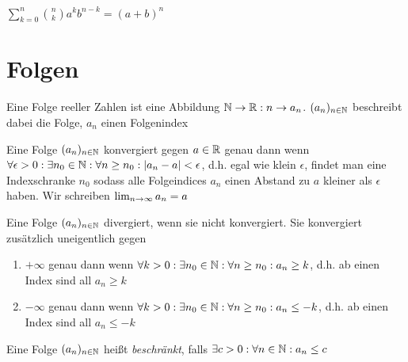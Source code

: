 \documentclass[]{article}
\begin{document}
\begin{satz}
	$\sum_{k=0}^{n} \binom{n}{k}a^k b^{n-k} = (a+b)^n$ 
\end{satz}

\section{Folgen}

\begin{definition}
	Eine Folge reeller Zahlen ist eine Abbildung $\mathbb{N} \rightarrow \mathbb{R} : n \rightarrow a_n$. $(a_{n})_{n \in \mathbb{N}}$ beschreibt dabei die Folge, $a_n$ einen Folgenindex
\end{definition}


\begin{definition}
	Eine Folge $(a_{n})_{n \in \mathbb{N}}$ konvergiert gegen $a \in \mathbb{R}$ genau dann wenn \\ $\forall \epsilon > 0 : \exists n_0 \in \mathbb{N} : \forall n \geq n_0 : | a_n - a | < \epsilon$, d.h. egal wie klein $\epsilon$, findet man eine Indexschranke $n_0$ sodass alle Folgeindices $a_n$ einen Abstand zu $a$ kleiner als $\epsilon$ haben. Wir schreiben $\lim_{n \rightarrow \infty} a_n = a$
\end{definition}

\begin{definition}
	Eine Folge $(a_{n})_{n \in \mathbb{N}}$ divergiert, wenn sie nicht konvergiert. Sie konvergiert zusätzlich uneigentlich gegen
	\begin{enumerate}[noitemsep]
		\item $+ \infty$ genau dann wenn $\forall k > 0 : \exists n_0 \in \mathbb{N} : \forall n \geq n_0 : a_n \geq k$, d.h. ab einen Index sind all $a_n \geq k$
		\item $- \infty$ genau dann wenn $\forall k > 0 : \exists n_0 \in \mathbb{N} : \forall n \geq n_0 : a_n \leq -k$, d.h. ab einen Index sind all $a_n \leq -k$		
	\end{enumerate}
\end{definition}

\begin{definition}
	Eine Folge $(a_{n})_{n \in \mathbb{N}}$ heißt \emph{beschränkt}, falls $\exists c > 0 : \forall n \in \mathbb{N} : a_n \leq c$
\end{definition}
\end{document}
